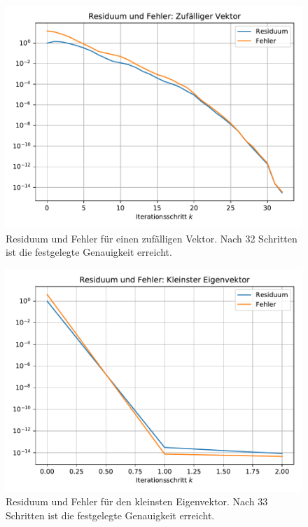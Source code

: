 \documentclass[10pt,a4paper]{article}
\begin{document}
\begin{figure}[H]
  \centering
  \includegraphics[width=.85\textwidth]{../figures/residuum_and_errors_zufaelliger_vektor.pdf}
  \caption{
    Residuum und Fehler für einen zufälligen Vektor.
    Nach \num{32} Schritten ist die festgelegte Genauigkeit erreicht.
  }
  \label{fig:random}
\end{figure}

\begin{figure}[H]
  \centering
  \includegraphics[width=.85\textwidth]{../figures/residuum_and_errors_kleinster_eigenvektor.pdf}
  \caption{
    Residuum und Fehler für den kleinsten Eigenvektor.
    Nach \num{33} Schritten ist die festgelegte Genauigkeit erreicht.
  }
  \label{fig:eigen}
\end{figure}
\end{document}

